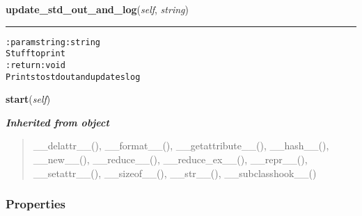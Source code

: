 \hspace{.8\funcindent}\begin{boxedminipage}{\funcwidth}

    \raggedright \textbf{update\_std\_out\_and\_log}(\textit{self}, \textit{string})

    \vspace{-1.5ex}

    \rule{\textwidth}{0.5\fboxrule}
\setlength{\parskip}{2ex}
\begin{alltt}

:param string: string
    Stuff to print
:return: void
    Prints to stdout and updates log
\end{alltt}

\setlength{\parskip}{1ex}
    \end{boxedminipage}

    \label{hal:profile:performance:EightQueenTest:start}

    \vspace{0.5ex}

\hspace{.8\funcindent}\begin{boxedminipage}{\funcwidth}

    \raggedright \textbf{start}(\textit{self})

\setlength{\parskip}{2ex}
\setlength{\parskip}{1ex}
    \end{boxedminipage}


\large{\textbf{\textit{Inherited from object}}}

\begin{quote}
\_\_delattr\_\_(), \_\_format\_\_(), \_\_getattribute\_\_(), \_\_hash\_\_(), \_\_new\_\_(), \_\_reduce\_\_(), \_\_reduce\_ex\_\_(), \_\_repr\_\_(), \_\_setattr\_\_(), \_\_sizeof\_\_(), \_\_str\_\_(), \_\_subclasshook\_\_()
\end{quote}


  \subsubsection{Properties}

